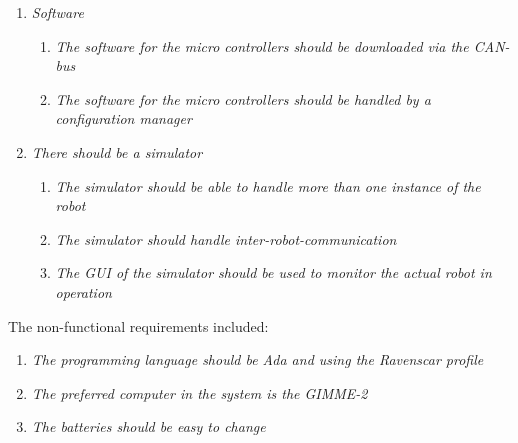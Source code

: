 \begin{enumerate}
   \item { \em Software} 
   \begin{enumerate}
   		\item { \em The software for the micro controllers should be downloaded via the CAN-bus} 
   		\item { \em The software for the micro controllers should be handled by a configuration manager}	
   \end{enumerate}
   \item { \em There should be a simulator} 
      \begin{enumerate}
   		\item { \em The simulator should be able to handle more than one instance
			of the robot} 
   		\item { \em The simulator should handle inter-robot-communication} 
		\item { \em The GUI of the simulator should be used to monitor the actual
				robot in operation} 		
   \end{enumerate}
\end{enumerate}

The non-functional requirements included:
\begin{enumerate}
   \item { \em The programming language should be Ada and using the Ravenscar profile} 
   \item { \em The preferred computer in the system is the GIMME-2} 
   \item { \em The batteries should be easy to change} 
\end{enumerate}
